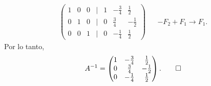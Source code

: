 \documentclass[11pt,respuestas,a4]{aleph-examen}
\begin{document}
\begin{preguntas}
\begin{respuesta}
\begin{align*}
\begin{pmatrix}
            1 & 0 & 0 & | & 1 & -\frac{3}{4} & \frac{1}{2} \\
            0 & 1 & 0 & | & 0 & \frac{3}{4} & -\frac{1}{2} \\
            0 & 0 & 1 & | & 0 & -\frac{1}{4} & \frac{1}{2}
        \end{pmatrix}
        && -F_2+F_1\rightarrow F_1.
    \end{align*}
    Por lo tanto,
    \[
        A^{-1}=\begin{pmatrix}
            1 & -\frac{3}{4} & \frac{1}{2} \\
            0 & \frac{3}{4} & -\frac{1}{2} \\
            0 & -\frac{1}{4} & \frac{1}{2}
        \end{pmatrix}.\qedhere
    \]
\end{respuesta}

\end{preguntas}
\end{document}
